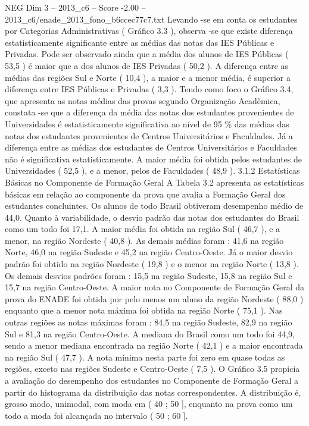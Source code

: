 \begin{textsample}{NEG Dim 3 – 2013\_c6 – Score -2.00 – 2013\_c6/enade\_2013\_fono\_b6ccec77c7.txt}
Levando -se em conta os estudantes por Categorias Administrativas ( Gráfico 3.3 ), observa -se que existe diferença estatisticamente significante entre as médias das notas das IES Públicas e Privadas.
Pode ser observado ainda que a média dos alunos de IES Públicas ( 53,5 ) é maior que a dos alunos de IES Privadas ( 50,2 ).
A diferença entre as médias das regiões Sul e Norte ( 10,4 ), a maior e a menor média, é superior a diferença entre IES Públicas e Privadas ( 3,3 ).
Tendo como foco o Gráfico 3.4, que apresenta as notas médias das provas segundo Organização Acadêmica, constata -se que a diferença da média das notas dos estudantes provenientes de Universidades é estatisticamente significativa ao nível de 95 \% das médias das notas dos estudantes provenientes de Centros Universitários e Faculdades.
Já a diferença entre as médias dos estudantes de Centros Universitários e Faculdades não é significativa estatisticamente.
A maior média foi obtida pelos estudantes de Universidades ( 52,5 ), e a menor, pelos de Faculdades ( 48,9 ). 3.1.2 Estatísticas Básicas no Componente de Formação Geral A Tabela 3.2 apresenta as estatísticas básicas em relação ao componente da prova que avalia a Formação Geral dos estudantes concluintes.
Os alunos de todo Brasil obtiveram desempenho médio de 44,0.
Quanto à variabilidade, o desvio padrão das notas dos estudantes do Brasil como um todo foi 17,1.
A maior média foi obtida na região Sul ( 46,7 ), e a menor, na região Nordeste ( 40,8 ).
As demais médias foram : 41,6 na região Norte, 46,0 na região Sudeste e 45,2 na região Centro-Oeste.
Já o maior desvio padrão foi obtido na região Nordeste ( 19,8 ) e o menor na região Norte ( 13,8 ).
Os demais desvios padrões foram : 15,5 na região Sudeste, 15,8 na região Sul e 15,7 na região Centro-Oeste.
A maior nota no Componente de Formação Geral da prova do ENADE foi obtida por pelo menos um aluno da região Nordeste ( 88,0 ) enquanto que a menor nota máxima foi obtida na região Norte ( 75,1 ).
Nas outras regiões as notas máximas foram : 84,5 na região Sudeste, 82,9 na região Sul e 81,3 na região Centro-Oeste.
A mediana do Brasil como um todo foi 44,9, sendo a menor mediana encontrada na região Norte ( 42,1 ) e a maior encontrada na região Sul ( 47,7 ).
A nota mínima nesta parte foi zero em quase todas as regiões, exceto nas regiões Sudeste e Centro-Oeste ( 7,5 ).
O Gráfico 3.5 propicia a avaliação do desempenho dos estudantes no Componente de Formação Geral a partir do histograma da distribuição das notas correspondentes.
A distribuição é, grosso modo, unimodal, com moda em ( 40 ; 50 ], enquanto na prova como um todo a moda foi alcançada no intervalo ( 50 ; 60 ].

\end{textsample}
